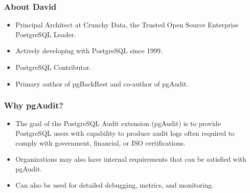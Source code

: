 %
\def\mytitle{pgAudit Overview}
\def\mysubject{}
\def\myevent{Crunchy Storm}
\def\myauthor{David Steele}
\def\myemail{}
\def\mydate{November 28, 2018}

\def\mysuppressnav{}

\def\mytemplatepath{/template/}


\begin{frame}
    \frametitle{About David}

    \begin{itemize}
        \item Principal Architect at Crunchy Data, the Trusted Open Source Enterprise PostgreSQL Leader.
        \item Actively developing with PostgreSQL since 1999.
        \item PostgreSQL Contributor.
        \item Primary author of pgBackRest and co-author of pgAudit.
    \end{itemize}
\end{frame}

\begin{frame}
    \frametitle{Why pgAudit?}

    \begin{itemize}
        \item The goal of the PostgreSQL Audit extension (pgAudit) is to provide PostgreSQL users with capability to produce audit logs often required to comply with government, financial, or ISO certifications.
        \item Organizations may also have internal requirements that can be satisfied with pgAudit.
        \item Can also be used for detailed debugging, metrics, and monitoring.
    \end{itemize}
\end{frame}

